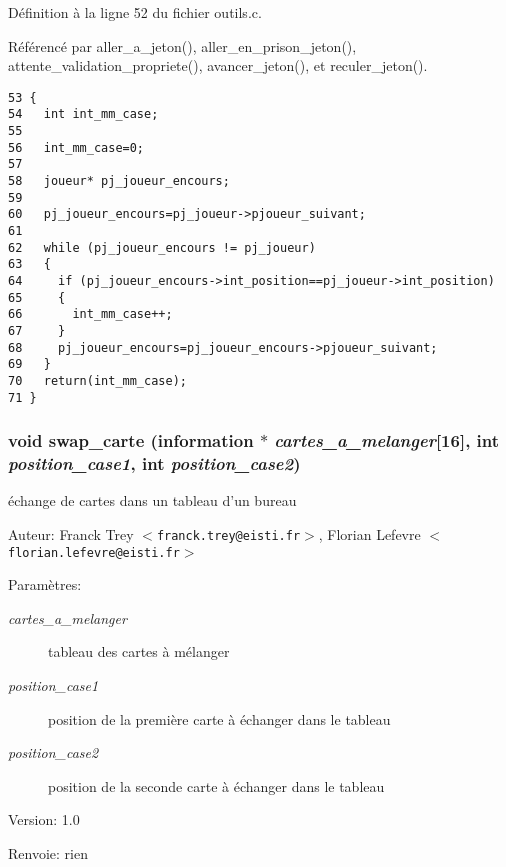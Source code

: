 D\'{e}finition \`{a} la ligne 52 du fichier outils.c.

R\'{e}f\'{e}renc\'{e} par aller\_\-a\_\-jeton(), aller\_\-en\_\-prison\_\-jeton(), attente\_\-validation\_\-propriete(), avancer\_\-jeton(), et reculer\_\-jeton().

\begin{Code}\begin{verbatim}53 {
54   int int_mm_case;
55   
56   int_mm_case=0;
57   
58   joueur* pj_joueur_encours;
59   
60   pj_joueur_encours=pj_joueur->pjoueur_suivant;
61   
62   while (pj_joueur_encours != pj_joueur)
63   {
64     if (pj_joueur_encours->int_position==pj_joueur->int_position)
65     {
66       int_mm_case++;
67     }
68     pj_joueur_encours=pj_joueur_encours->pjoueur_suivant;
69   }
70   return(int_mm_case);
71 }
\end{verbatim}\end{Code}


\subsubsection{\setlength{\rightskip}{0pt plus 5cm}void swap\_\-carte ({\bf information} $\ast$ {\em cartes\_\-a\_\-melanger}[16], int {\em position\_\-case1}, int {\em position\_\-case2})}\label{outils_8h_449869c420d1199183139e03451f2adf}


\'{e}change de cartes dans un tableau d'un bureau 

\begin{Desc}
\item[Auteur:]Franck Trey $<${\tt franck.trey@eisti.fr}$>$, Florian Lefevre $<${\tt florian.lefevre@eisti.fr}$>$\end{Desc}
\begin{Desc}
\item[Param\`{e}tres:]
\begin{description}
\item[{\em cartes\_\-a\_\-melanger}]tableau des cartes \`{a} m\'{e}langer \item[{\em position\_\-case1}]position de la premi\`{e}re carte \`{a} \'{e}changer dans le tableau \item[{\em position\_\-case2}]position de la seconde carte \`{a} \'{e}changer dans le tableau\end{description}
\end{Desc}
\begin{Desc}
\item[Version:]1.0 \end{Desc}
\begin{Desc}
\item[Renvoie:]rien \end{Desc}


